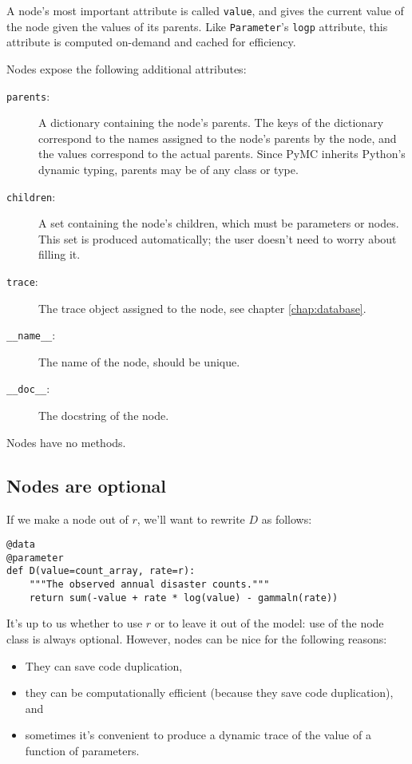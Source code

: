 A node's most important attribute is called \texttt{value}, and gives the current value of the node given the values of its parents. Like \texttt{Parameter}'s \texttt{logp} attribute, this attribute is computed on-demand and cached for efficiency.

Nodes expose the following additional attributes:
\begin{description}
    \item[\texttt{parents}:] A dictionary containing the node's parents. The keys of the dictionary correspond to the names assigned to the node's parents by the node, and the values correspond to the actual parents. Since PyMC inherits Python's dynamic typing, parents may be of any class or type.
    \item[\texttt{children}:] A set containing the node's children, which must be parameters or nodes. This set is produced automatically; the user doesn't need to worry about filling it.
    \item[\texttt{trace}:] The trace object assigned to the node, see chapter \ref{chap:database}.
    \item[\texttt{\_\_name\_\_}:] The name of the node, should be unique.
    \item[\texttt{\_\_doc\_\_}:] The docstring of the node.
\end{description}
Nodes have no methods.

\subsection{Nodes are optional}
If we make a node out of $r$, we'll want to rewrite $D$ as follows:
\begin{verbatim}
@data
@parameter
def D(value=count_array, rate=r):
    """The observed annual disaster counts."""
    return sum(-value + rate * log(value) - gammaln(rate))
\end{verbatim}
It's up to us whether to use $r$ or to leave it out of the model: use of the node class is always optional. However, nodes can be nice for the following reasons:
\begin{itemize}
    \item They can save code duplication,    
    \item they can be computationally efficient (because they save code duplication), and
    \item sometimes it's convenient to produce a dynamic trace of the value of a function of parameters.
\end{itemize}


